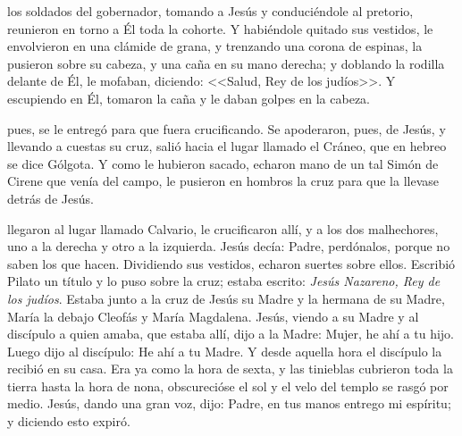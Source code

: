 \documentclass[10pt,twoside]{book}
\begin{document}
\vspace{2mm}



\vspace{5mm}

\noindent{}
los soldados del gobernador, tomando a Jesús y conduciéndole al pretorio, reunieron en torno a Él toda la cohorte. 
Y habiéndole quitado sus vestidos, le envolvieron en una clámide de grana, y trenzando una corona de espinas, la pusieron sobre su cabeza, 
y una caña en su mano derecha; y doblando la rodilla delante de Él, le mofaban, diciendo: <<Salud, Rey de los judíos>>. Y escupiendo en Él, 
tomaron la caña y le daban golpes en la cabeza.

\vspace{2mm}



\vspace{5mm}

\noindent{}
pues, se le entregó para que fuera crucificando. Se apoderaron, pues, de Jesús, y llevando a cuestas su cruz, 
salió hacia el lugar llamado el Cráneo, que en hebreo se dice Gólgota. Y como le hubieron sacado, echaron mano de un tal Simón de Cirene que venía del campo, 
le pusieron en hombros la cruz para que la llevase detrás de Jesús.

\vspace{2mm}



\vspace{5mm}

\noindent{}
llegaron al lugar llamado Calvario, le crucificaron allí, y a los dos malhechores, uno a la derecha y otro a la izquierda. 
Jesús decía: Padre, perdónalos, porque no saben los que hacen. Dividiendo sus vestidos, echaron suertes sobre ellos. Escribió Pilato un título y lo puso sobre la cruz;
estaba escrito: \textit{Jesús Nazareno, Rey de los judíos}. Estaba junto a la cruz de Jesús su Madre y la hermana de su Madre, María la debajo Cleofás y María Magdalena.
Jesús, viendo a su Madre y al discípulo a quien amaba, que estaba allí, dijo a la Madre: Mujer, he ahí a tu hijo. Luego dijo al discípulo: He ahí a tu Madre.
Y desde aquella hora el discípulo la recibió en su casa. Era ya como la hora de sexta, y las tinieblas cubrieron toda la tierra hasta la hora de nona,
obscurecióse el sol y el velo del templo se rasgó por medio. Jesús, dando una gran voz, dijo: Padre, en tus manos entrego mi espíritu; y diciendo esto expiró.
\end{document}
